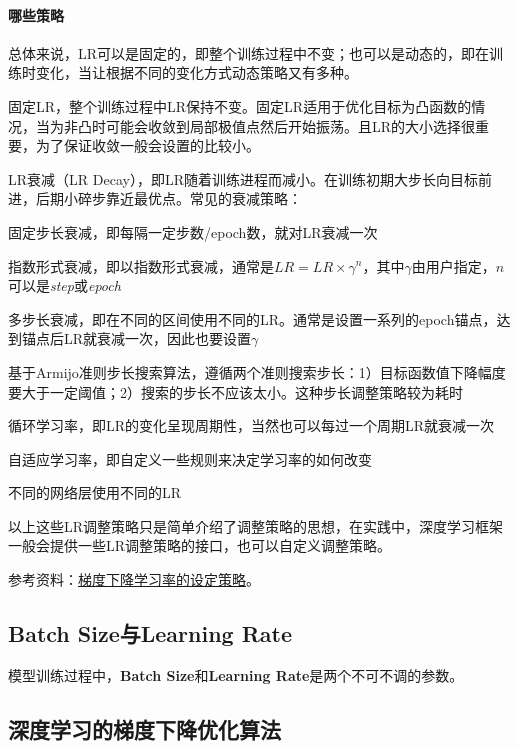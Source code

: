 \paragraph{哪些策略}总体来说，LR可以是固定的，即整个训练过程中不变；也可以是动态的，即在训练时变化，当让根据不同的变化方式动态策略又有多种。
\begin{myitemize}
	\item 固定LR，整个训练过程中LR保持不变。固定LR适用于优化目标为凸函数的情况，当为非凸时可能会收敛到局部极值点然后开始振荡。且LR的大小选择很重要，为了保证收敛一般会设置的比较小。
	\item LR衰减（LR Decay），即LR随着训练进程而减小。在训练初期大步长向目标前进，后期小碎步靠近最优点。常见的衰减策略：
	\begin{myitemize}
		\item 固定步长衰减，即每隔一定步数/epoch数，就对LR衰减一次
		\item 指数形式衰减，即以指数形式衰减，通常是$LR = LR \times \gamma^{n}$，其中$\gamma$由用户指定，$n$可以是\textit{step}或\textit{epoch}
		\item 多步长衰减，即在不同的区间使用不同的LR。通常是设置一系列的epoch锚点，达到锚点后LR就衰减一次，因此也要设置$\gamma$
	\end{myitemize}
	\item 基于Armijo准则步长搜索算法，遵循两个准则搜索步长：1）目标函数值下降幅度要大于一定阈值；2）搜索的步长不应该太小。这种步长调整策略较为耗时
	\item 循环学习率，即LR的变化呈现周期性，当然也可以每过一个周期LR就衰减一次
	\item 自适应学习率，即自定义一些规则来决定学习率的如何改变
	\item 不同的网络层使用不同的LR
\end{myitemize}
以上这些LR调整策略只是简单介绍了调整策略的思想，在实践中，深度学习框架一般会提供一些LR调整策略的接口，也可以自定义调整策略。

参考资料：\href{https://lumingdong.cn/setting-strategy-of-gradient-descent-learning-rate.html}{梯度下降学习率的设定策略}。

\subsection{Batch Size与Learning Rate}
模型训练过程中，\textbf{Batch Size}和\textbf{Learning Rate}是两个不可不调的参数。


\subsection{深度学习的梯度下降优化算法}


